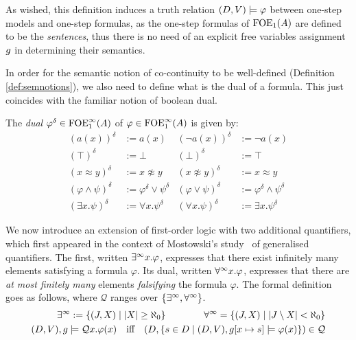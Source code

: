 As wished, this definition induces a truth relation $(D, V) \models \varphi$ between one-step models and one-step formulas, as the one-step formulas of $\mathrm{FOE}_1(A)$ are defined to be the \emph{sentences}, thus there is no need of an explicit free variables assignment $g$ in determining their semantics.

In order for the semantic notion of co-continuity to be well-defined (Definition \ref{def:semnotions}), we also need to define what is the dual of a formula. This just coincides with the familiar notion of boolean dual.
\begin{definition}\label{def:concreteduals} 
The \emph{dual} $\varphi^{\delta} \in {\ensuremath{\mathrm{FOE}^{\infty}_1}}(A)$ of $\varphi\in {\ensuremath{\mathrm{FOE}^{\infty}_1}}(A)$ is given by:
\begin{align*}
 (a(x))^{\delta} & :=  a(x) 
 & (\lnot a(x))^{\delta} & :=  \lnot a(x) 
\\ (\top)^{\delta} & :=  \bot 
  & (\bot)^{\delta} & :=  \top 
\\  (x \approx y)^{\delta} & :=  x \not\approx y 
  & (x \not\approx y)^{\delta}& :=  x \approx y 
\\ (\varphi \wedge \psi)^{\delta} &:=  \varphi^{\delta} \vee \psi^{\delta} 
  &(\varphi \vee \psi)^{\delta}& :=  \varphi^{\delta} \wedge \psi^{\delta}
\\ (\exists x.\psi)^{\delta} &:=  \forall x.\psi^{\delta} 
  &(\forall x.\psi)^{\delta} &:=  \exists x.\psi^{\delta} 
\end{align*}
\end{definition}

We now introduce an extension of first-order logic with two additional quantifiers, which first appeared in the context of Mostowski's study~\cite{Mostowski1957} of generalised quantifiers. The first, written $\exists^\infty x. \varphi$, expresses that there exist infinitely many elements satisfying a formula $\varphi$. Its dual, written $\forall^\infty x. \varphi$, expresses that there are \emph{at most finitely many} elements \emph{falsifying} the formula $\varphi$. The formal definition goes as follows, where $\mathcal Q$ ranges over $\{\exists^\infty, \forall^\infty\}$.
\begin{equation}\label{eq:definfquant}
\begin{aligned}
\qu := \{(J,X) \mid |X| \geq \aleph_0\} \qquad \qquad \dqu =\{(J,X) \mid |J\setminus X| < \aleph_0\} \\
(D,V),\ass \models {\mathcal Q}x. \phi(x) \quad\text{iff}\quad (D , \{s\in D \mid (D, \val),\ass[x\mapsto s] \models \phi(x) \}) \in {\mathcal Q}
\end{aligned}
\end{equation}

